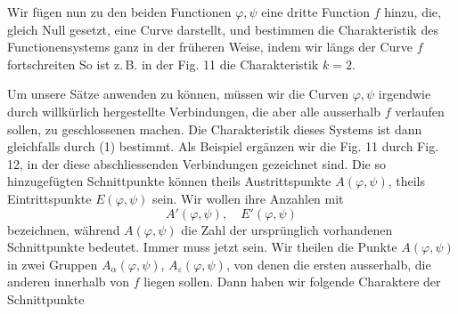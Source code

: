 Wir fügen nun zu den beiden Functionen $\varphi, \psi$ eine dritte Function $f$ hinzu, die, gleich Null gesetzt, eine  Curve darstellt, und bestimmen die Charakteristik des Functionensystems ganz in der früheren Weise, indem wir längs der Curve $f$ fortschreiten
So ist z.\,B. in der Fig. 11 die Charakteristik $k = 2$.


Um unsere Sätze anwenden zu können, müssen wir die Curven $\varphi, \psi$ irgendwie durch willkürlich hergestellte Verbindungen, die aber alle ausserhalb $f$ verlaufen sollen, zu geschlossenen machen. Die Charakteristik dieses Systems ist dann gleichfalls durch (1) bestimmt. Als Beispiel ergänzen wir die Fig. 11 durch Fig. 12, in der diese abschliessenden Verbindungen gezeichnet sind. Die so hinzugefügten Schnittpunkte können theils Austrittspunkte $A(\varphi,\psi)$, theils Eintrittspunkte $E(\varphi,\psi)$ sein. Wir wollen ihre Anzahlen mit
\[
A'(\varphi,\psi), \quad E'(\varphi,\psi)
\]
bezeichnen, während $A(\varphi,\psi)$ die Zahl der ursprünglich vorhandenen Schnittpunkte bedeutet. Immer muss jetzt
sein. Wir theilen die Punkte $A(\varphi,\psi)$ in zwei Gruppen $A_\alpha(\varphi,\psi)$, $A_\varepsilon(\varphi,\psi)$, von denen die ersten ausserhalb, die anderen innerhalb von $f$ liegen sollen. Dann haben wir folgende Charaktere der Schnittpunkte

